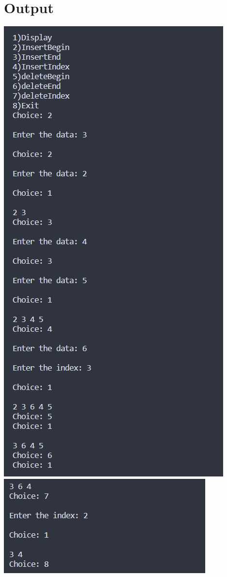 \section{Output}
\includegraphics[]{Cycle_2/Outputs/LinkedList1.png}
\includegraphics[]{Cycle_2/Outputs/LinkedList2.png}